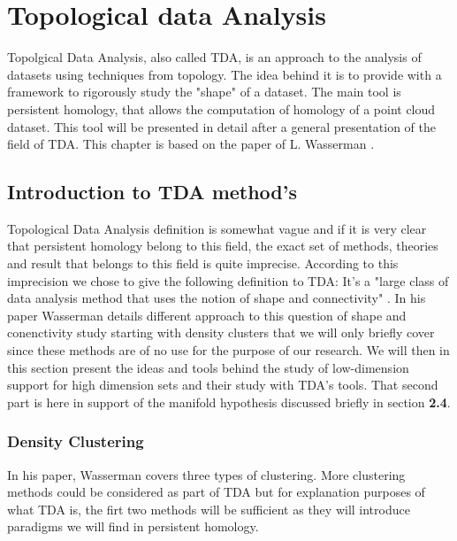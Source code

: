 \documentclass[12pt, a4paper]{article}
\begin{document}
\newpage
\thispagestyle{empty}
\mbox{}
\newpage

\section{Topological data Analysis}

Topolgical Data Analysis, also called TDA, is an approach to the analysis of datasets using techniques from topology. The idea behind it is to provide with a framework to rigorously study the "shape" of a dataset. The main tool is persistent homology, that allows the computation of homology of a point cloud dataset. This tool will be presented in detail after a general presentation of the field of TDA. This chapter is based on the paper of L. Wasserman \cite{wasserman_topological_2016}. 

\subsection{Introduction to TDA method's}

Topological Data Analysis definition is somewhat vague and if it is very clear that persistent homology belong to this field, the exact set of methods, theories and result that belongs to this field is quite imprecise. According to this imprecision we chose to give the following definition to TDA: It's a "large class of data analysis method that uses the notion of shape and connectivity" \cite{wasserman_topological_2016}. In his paper Wasserman details different approach to this question of shape and conenctivity study starting with density clusters that we will only briefly cover since these methods are of no use for the purpose of our research. We will then in this section present the ideas and tools behind the study of low-dimension support for high dimension sets and their study with TDA's tools. That second part is here in support of the manifold hypothesis discussed briefly in section \textbf{2.4}.

\subsubsection{Density Clustering}

In his paper, Wasserman covers three types of clustering. More clustering methods could be considered as part of TDA but for explanation purposes of what TDA is, the firt two methods will be sufficient as they will introduce paradigms we will find in persistent homology.\\
\end{document}
